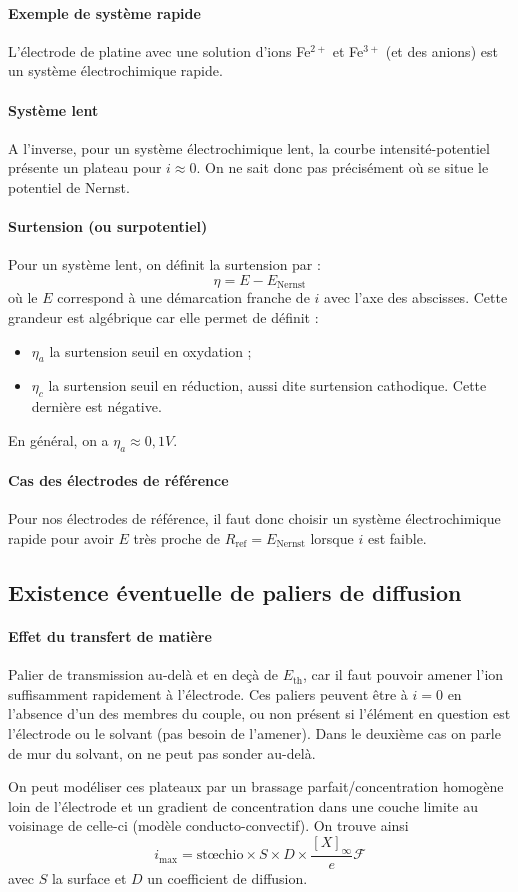 \documentclass[french]{book}
\theoremstyle{plain}
\theoremstyle{definition}
\theoremstyle{remark}
\begin{document}
\paragraph{Exemple de système rapide} L'électrode de platine avec une solution d'ions Fe$^{2+}$ et Fe$^{3+}$ (et des anions) est un système électrochimique rapide.

\paragraph{Système lent} A l'inverse, pour un système électrochimique lent, la courbe intensité-potentiel présente un plateau pour $i\approx 0$. On ne sait donc pas précisément où se situe le potentiel de Nernst.

\paragraph{Surtension (ou surpotentiel)} Pour un système lent, on définit la surtension par : $$\eta=E-E_\text{Nernst}$$ où le $E$ correspond à une démarcation franche de $i$ avec l'axe des abscisses. Cette grandeur est algébrique car elle permet de définit :\begin{itemize}
	\item $\eta_a$ la surtension seuil en oxydation ;
	\item $\eta_c$ la surtension seuil en réduction, aussi dite surtension cathodique. Cette dernière est négative.
\end{itemize}
En général, on a $\eta_a\approx 0,1 V$.

\paragraph{Cas des électrodes de référence} Pour nos électrodes de référence, il faut donc choisir un système électrochimique rapide pour avoir $E$ très proche de $R_\text{ref}=E_\text{Nernst}$ lorsque $i$ est faible.

\subsection{Existence éventuelle de paliers de diffusion}

\paragraph{Effet du transfert de matière} Palier de transmission au-delà et en deçà de $E_\text{th}$, car il faut pouvoir amener l’ion suffisamment rapidement à l’électrode. Ces paliers peuvent être à $i=0$ en l’absence d’un des membres du couple, ou non présent si l’élément en question est l’électrode ou le solvant (pas besoin de l’amener). Dans le deuxième cas on parle de mur du solvant, on ne peut pas
sonder au-delà. \par On peut modéliser ces plateaux par un brassage parfait/concentration homogène loin de l’électrode et un gradient de concentration dans une couche limite au voisinage de celle-ci (modèle conducto-convectif). On trouve ainsi $$i_\text{max}=\text{stœchio}\times S\times D\times \frac{[X]_\infty}{e}\mathcal{F}$$ avec $S$ la surface et $D$ un coefficient de diffusion.
\end{document}
